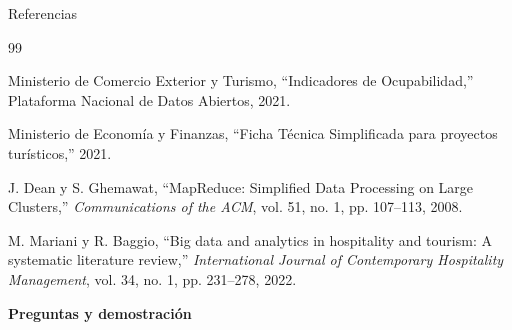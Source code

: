 \documentclass{beamer}
\begin{document}
\begin{frame}[allowframebreaks]{Referencias}
\footnotesize
\begin{thebibliography}{99}

Ministerio de Comercio Exterior y Turismo,
``Indicadores de Ocupabilidad,''
Plataforma Nacional de Datos Abiertos, 2021.

Ministerio de Economía y Finanzas,
``Ficha Técnica Simplificada para proyectos turísticos,''
2021.

J. Dean y S. Ghemawat,
``MapReduce: Simplified Data Processing on Large Clusters,''
\textit{Communications of the ACM},
vol. 51, no. 1, pp. 107--113, 2008.

M. Mariani y R. Baggio,
``Big data and analytics in hospitality and tourism:
A systematic literature review,''
\textit{International Journal of Contemporary Hospitality Management},
vol. 34, no. 1, pp. 231--278, 2022.

\end{thebibliography}

\vfill
\centering
\Large\textbf{Preguntas y demostración}

\end{frame}
\end{document}
